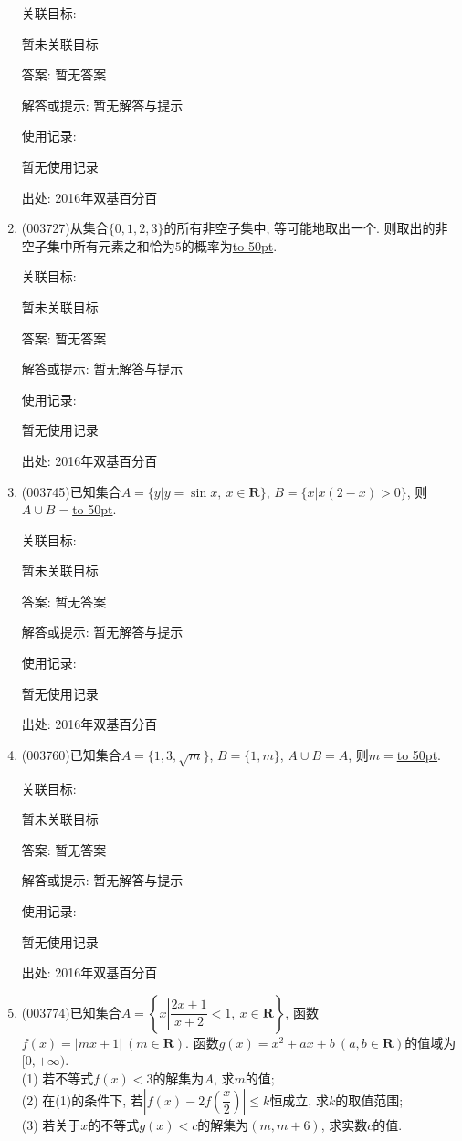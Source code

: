 \documentclass[10pt,a4paper]{article}
\newcommand{\blank}[1]{\underline{\hbox to #1pt{}}}
\begin{document}
\begin{enumerate}[1.]
关联目标:

暂未关联目标

答案: 暂无答案

解答或提示: 暂无解答与提示

使用记录:

暂无使用记录


出处: 2016年双基百分百
\item { (003727)}从集合$\{0,1,2,3\}$的所有非空子集中, 等可能地取出一个. 则取出的非空子集中所有元素之和恰为$5$的概率为\blank{50}.


关联目标:

暂未关联目标

答案: 暂无答案

解答或提示: 暂无解答与提示

使用记录:

暂无使用记录


出处: 2016年双基百分百
\item { (003745)}已知集合$A=\{y|y=\sin x, \ x\in \mathbf{R}\}$, $B=\{x|x(2-x)>0\}$, 则$A\cup B=$\blank{50}.


关联目标:

暂未关联目标

答案: 暂无答案

解答或提示: 暂无解答与提示

使用记录:

暂无使用记录


出处: 2016年双基百分百
\item { (003760)}已知集合$A=\{1,3,\sqrt{m}\}$, $B=\{1,m\}$, $A\cup B=A$, 则$m=$\blank{50}.


关联目标:

暂未关联目标

答案: 暂无答案

解答或提示: 暂无解答与提示

使用记录:

暂无使用记录


出处: 2016年双基百分百
\item { (003774)}已知集合$A=\left\{x\left|\dfrac{2x+1}{x+2}<1, \ x\in \mathbf{R}\right.\right\}$, 函数$f(x)=|mx+1| \ (m\in \mathbf{R})$. 函数$g(x)=x^2+ax+b \ (a,b\in \mathbf{R})$的值域为$[0,+\infty)$.\\
(1) 若不等式$f(x)<3$的解集为$A$, 求$m$的值;\\
(2) 在(1)的条件下, 若$\left|f(x)-2f\left(\dfrac x 2\right)\right|\le k$恒成立, 求$k$的取值范围;\\
(3) 若关于$x$的不等式$g(x)<c$的解集为$(m,m+6)$, 求实数$c$的值.



\end{enumerate}
\end{document}
